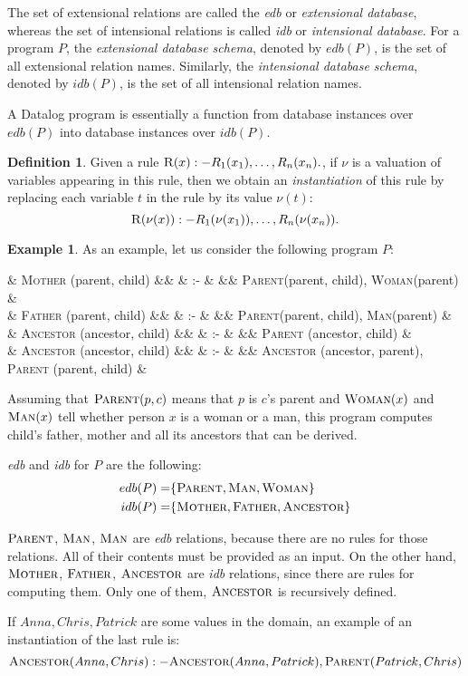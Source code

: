 \documentclass{pracamgr}
\theoremstyle{plain}
\theoremstyle{definition}
\newtheorem{defn}{Definition}[section]
\newtheorem{exmp}{Example}[section]
\theoremstyle{remark}
\newcommand{\narrow}[1]{\begin{changemargin}{2cm}{2cm} #1 \end{changemargin}}
\newcommand{\relat}[2]{$\textsc{#1}#2$}
\newcommand{\rdprog}[2]{
  \narrow{
      #1
      \begin{flalign*}
      #2
      \end{flalign*}
    }
}
\begin{document}
The set of extensional relations are called the \emph{edb} or \emph{extensional database}, whereas the set of intensional relations is called \emph{idb} or \emph{intensional database}. For a program $P$, the \emph{extensional database schema}, denoted by $edb(P)$, is the set of all extensional relation names. Similarly, the \emph{intensional database schema}, denoted by $idb(P)$, is the set of all intensional relation names. 

A Datalog program is essentially a function from database instances over $edb(P)$ into database instances over $idb(P)$.

\begin{defn}
Given a rule $ \textsc{R}(x) :- R_1(x_1), \dots, R_n(x_n). $, if $\nu$ is a valuation of variables appearing in this rule, then we obtain an \emph{instantiation} of this rule by replacing each variable $t$ in the rule by its value $\nu(t)$:
$$ \textsc{R}(\nu(x)) :- R_1(\nu(x_1)), \dots, R_n(\nu(x_n)). $$
\end{defn}

\begin{exmp}
As an example, let us consider the following program $P$:

\rdprog{}{
  & \textsc{Mother} (parent, child) &&  & :- & && \textsc{Parent}(parent, child), \textsc{Woman}(parent) & \\
  & \textsc{Father} (parent, child) &&  & :- & && \textsc{Parent}(parent, child), \textsc{Man}(parent) & \\
  & \textsc{Ancestor} (ancestor, child) &&  & :- & && \textsc{Parent} (ancestor, child) &\\
  & \textsc{Ancestor} (ancestor, child) &&  & :- & && \textsc{Ancestor} (ancestor, parent), \textsc{Parent} (parent, child) &\\
}{}{}

Assuming that \relat{Parent}{(p, c)} means that $p$ is $c$'s parent and \relat{Woman}{(x)} and \relat{Man}{(x)} tell whether person $x$ is a woman or a man, this program computes child's father, mother and all its ancestors that can be derived.

\emph{edb} and \emph{idb} for $P$ are the following:
\begin{align*}
edb(P) =& \{\textsc{Parent}, \textsc{Man}, \textsc{Woman}\} \\
idb(P) =& \{\textsc{Mother}, \textsc{Father}, \textsc{Ancestor}\}
\end{align*}

\relat{Parent}{}, \relat{Man}{}, \relat{Man}{} are \emph{edb} relations, because there are no rules for those relations. All of their contents must be provided as an input. On the other hand, \relat{Mother}{}, \relat{Father}{}, \relat{Ancestor}{} are \emph{idb} relations, since there are rules for computing them. Only one of them, \relat{Ancestor}{} is recursively defined.

If $Anna, Chris, Patrick$ are some values in the domain, an example of an instantiation of the last rule is:
$$\textsc{Ancestor}(Anna, Chris) :- \textsc{Ancestor} (Anna, Patrick), \textsc{Parent} (Patrick, Chris)$$
\end{exmp}
\end{document}
